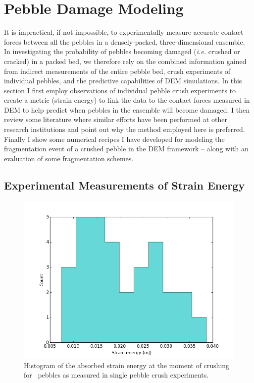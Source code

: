\section{Pebble Damage Modeling}\label{sec:failure-study}

It is impractical, if not impossible, to experimentally measure accurate contact forces between all the pebbles in a densely-packed, three-dimensional ensemble. In investigating the probability of pebbles becoming damaged (\textit{i.e.} crushed or cracked) in a packed bed, we therefore rely on the combined information gained from indirect measurements of the entire pebble bed, crush experiments of individual pebbles, and the predictive capabilities of DEM simulations. In this section I first employ observations of individual pebble crush experiments to create a metric (strain energy) to link the data to the contact forces measured in DEM to help predict when pebbles in the ensemble will become damaged. I then review some literature where similar efforts have been performed at other research institutions and point out why the method employed here is preferred. Finally I show some numerical recipes I have developed for modeling the fragmentation event of a crushed pebble in the DEM framework -- along with an evaluation of some fragmentation schemes. 

\subsection{Experimental Measurements of Strain Energy}
\begin{figure}[!t]
\centering
    \includegraphics[width=\doubleimagewidth]{chapters/figures/fzk-w-histogram.png}
    \caption{Histogram of the absorbed strain energy at the moment of crushing for \lis~pebbles as measured in single pebble crush experiments.}
    \label{fig:fzk-w-hist}
\end{figure}

